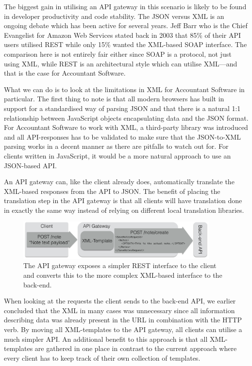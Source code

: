 \documentclass{cslthse-msc}
\begin{document}
The biggest gain in utilising an API gateway in this scenario is likely to be found in developer productivity and code stability. The JSON versus XML is an ongoing debate which has been active for several years. Jeff Barr who is the Chief Evangelist for Amazon Web Services stated back in 2003 that 85\% of their API users utilised REST while only 15\% wanted the XML-based SOAP interface\cite{soap_amazon}. The comparison here is not entirely fair either since SOAP is a protocol, not just using XML, while REST is an architectural style which can utilise XML---and that is the case for Accountant Software.

What we can do is to look at the limitations in XML for Accountant Software in particular. The first thing to note is that all modern browsers has built in support for a standardised way of parsing JSON and that there is a natural 1:1 relationship between JavaScript objects encapsulating data and the JSON format. For Accountant Software to work with XML, a third-party library was introduced and all API-responses has to be validated to make sure that the JSON-to-XML parsing works in a decent manner as there are pitfalls to watch out for. For clients written in JavaScript, it would be a more natural approach to use an JSON-based API.

An API gateway can, like the client already does, automatically translate the XML-based responses from the API to JSON. The benefit of placing the translation step in the API gateway is that all clients will have translation done in exactly the same way instead of relying on different local translation libraries.

\begin{figure}[H]
  \centering
    \begin{center}
      \includegraphics[width=0.9\textwidth]{images/api_gateway_xml.png}
    \end{center}
  \caption{The API gateway exposes a simpler REST interface to the client and converts this to the more complex XML-based interface to the back-end.}
\end{figure}

When looking at the requests the client sends to the back-end API, we earlier concluded that the XML in many cases was unnecessary since all information describing data was already present in the URL in combination with the HTTP verb. By moving all XML-templates to the API gateway, all clients can utilise a much simpler API. An additional benefit to this approach is that all XML-templates are gathered in one place in contrast to the current approach where every client has to keep track of their own collection of templates.
\end{document}
